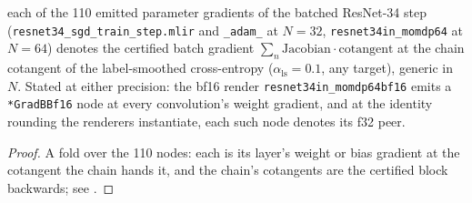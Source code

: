 \begin{theorem}
  \label{thm:resnet34_step_tie}
  \leanok
  \Prove{} each of the 110 emitted parameter gradients of the batched
  ResNet-34 step (\texttt{resnet34\_sgd\_train\_step.mlir} and
  \texttt{\_adam\_} at \(N = 32\), \texttt{resnet34in\_momdp64} at
  \(N = 64\)) denotes the certified batch gradient
  \(\sum_n \mathrm{Jacobian} \cdot \mathrm{cotangent}\) at the chain cotangent
  of the label-smoothed cross-entropy (\(\alpha_{\mathrm{ls}} = 0.1\), any
  target), generic in \(N\). Stated at either precision: the bf16 render
  \texttt{resnet34in\_momdp64bf16} emits a \texttt{*GradBBf16} node at every
  convolution's weight gradient, and at the identity rounding the renderers
  instantiate, each such node denotes its f32 peer.
\end{theorem}

\begin{proof}
\leanok
A fold over the 110 nodes: each is its layer's weight or bias gradient at
the cotangent the chain hands it, and the chain's cotangents are the
certified block backwards; see
.
\end{proof}

